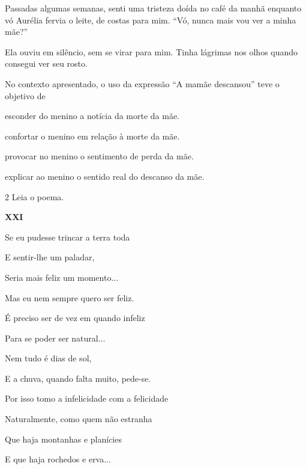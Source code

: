 \begin{myquote}
Passadas algumas semanas, senti uma tristeza doída no café da manhã
enquanto vó Aurélia fervia o leite, de costas para mim. ``Vó, nunca mais
vou ver a minha mãe?''
\end{myquote}

\begin{myquote}
Ela ouviu em silêncio, sem se virar para mim. Tinha lágrimas nos olhos
quando consegui ver seu rosto.
\end{myquote}


No contexto apresentado, o uso da expressão ``A mamãe descansou'' teve o
objetivo de

\begin{escolha}
\item esconder do menino a notícia da morte da mãe.

\item confortar o menino em relação à morte da mãe.

\item provocar no menino o sentimento de perda da mãe.

\item explicar ao menino o sentido real do descanso da mãe.
\end{escolha}

\num{2} Leia o poema.

\begin{myquote}
\textbf{XXI}

Se eu pudesse trincar a terra toda

E sentir-lhe um paladar,

Seria mais feliz um momento...

Mas eu nem sempre quero ser feliz.

É preciso ser de vez em quando infeliz

Para se poder ser natural...
\end{myquote}

\begin{myquote}
Nem tudo é dias de sol,

E a chuva, quando falta muito, pede-se.

Por isso tomo a infelicidade com a felicidade

Naturalmente, como quem não estranha

Que haja montanhas e planícies

E que haja rochedos e erva...
\end{myquote}

